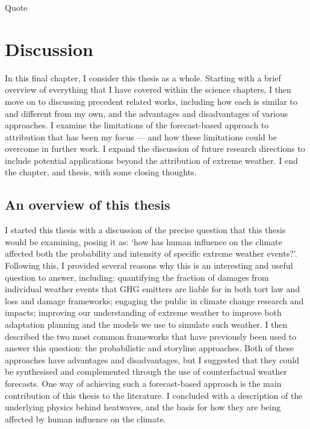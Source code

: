\begin{savequote}[8cm]
    Quote
\end{savequote}
    
\chapter{\label{discussion}Discussion} 

In this final chapter, I consider this thesis as a whole. Starting with a brief overview of everything that I have covered within the science chapters, I then move on to discussing precedent related works, including how each is similar to and different from my own, and the advantages and disadvantages of various approaches. I examine the limitations of the forecast-based approach to attribution that has been my focus --- and how these limitations could be overcome in further work. I expand the discussion of future research directions to include potential applications beyond the attribution of extreme weather. I end the chapter, and thesis, with some closing thoughts.

\minitoc

\clearpage

\section{An overview of this thesis}

  I started this thesis with a discussion of the precise question that this thesis would be examining, posing it as: `how has human influence on the climate affected both the probability and intensity of specific extreme weather events?'. Following this, I provided several reasons why this is an interesting and useful question to answer, including: quantifying the fraction of damages from individual weather events that GHG emitters are liable for in both tort law and loss and damage frameworks; engaging the public in climate change research and impacts; improving our understanding of extreme weather to improve both adaptation planning and the models we use to simulate such weather. I then described the two most common frameworks that have previously been used to answer this question: the probabilistic and storyline approaches. Both of these approaches have advantages and disadvantages, but I suggested that they could be synthesised and complemented through the use of counterfactual weather forecasts. One way of achieving such a forecast-based approach is the main contribution of this thesis to the literature. I concluded with a description of the underlying physics behind heatwaves, and the basis for how they are being affected by human influence on the climate.

